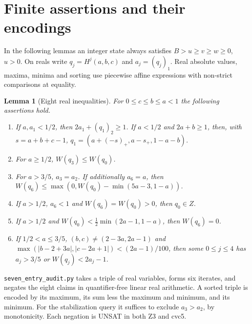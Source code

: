 \documentclass[11pt,reqno]{amsart}
\newtheorem{lemma}{Lemma}[section]
\begin{document}
\appendix
\section{Finite assertions and their encodings}\label{sec:appendix}
In the following lemmas an integer state always satisfies
$B>u\ge v\ge w\ge0$, $u>0$. On reals write $q_j=H^j(a,b,c)$ and
$a_j=(q_j)_1$. Real absolute values, maxima, minima and sorting use
piecewise affine expressions with non-strict comparisons at equality.

\begin{lemma}[Eight real inequalities]\label{l:entry}
For $0\le c\le b\le a<1$ the following assertions hold.
\begin{enumerate}
\item[(i)] If $a,a_1<1/2$, then $2a_1+(q_1)_2\ge1$. If $a<1/2$
and $2a+b\ge1$, then, with $s=a+b+c-1$,
$q_1=(a+(-s)_+,a-s_+,1-a-b)$.
\item[(ii)] For $a\ge1/2$, $W(q_3)\le W(q_0)$.
\item[(iii)] For $a>3/5$, $a_3=a_2$. If additionally $a_6=a$,
then $W(q_6)\le\max(0,W(q_0)-\min(5a-3,1-a))$.
\item[(iv)] If $a>1/2$, $a_6<1$ and $W(q_6)=W(q_0)>0$, then $q_0\in Z$.
\item[(v)] If $a>1/2$ and $W(q_0)<\tfrac12\min(2a-1,1-a)$,
then $W(q_6)=0$.
\item[(vi)] If $1/2<a\le3/5$, $(b,c)\ne(2-3a,2a-1)$ and
$\max(|b-2+3a|,|c-2a+1|)<(2a-1)/100$, then some $0\le j\le4$
has $a_j>3/5$ or $W(q_j)<2a_j-1$.
\end{enumerate}
\end{lemma}
\noindent
\texttt{seven\_entry\_audit.py} takes a triple of real variables, forms
six iterates, and negates the eight claims in quantifier-free linear real
arithmetic. A sorted triple is encoded by its maximum, its sum less the
maximum and minimum, and its minimum. For the stabilization query it
suffices to exclude $a_3>a_2$, by monotonicity. Each negation is UNSAT in
both Z3 and cvc5.
\end{document}
